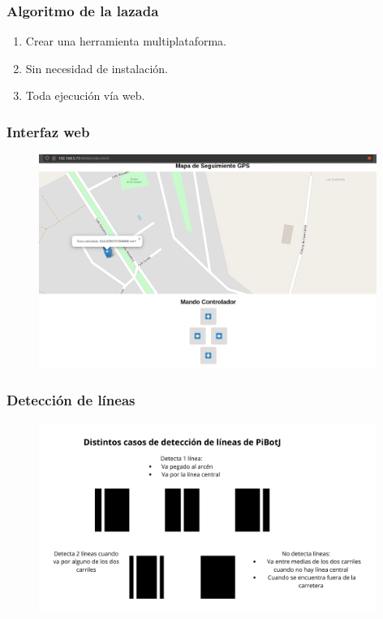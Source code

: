 \documentclass{beamer}
\begin{document}
\begin{frame}
	\frametitle{Algoritmo de la lazada}
	\begin{enumerate}
		\item Crear una herramienta multiplataforma.
		\item Sin necesidad de instalación.
		\item Toda ejecución vía web.
	\end{enumerate}
\end{frame}

\begin{frame}
	\frametitle{Interfaz web}
	\begin{figure}
		\centering
		\includegraphics[width=11cm]{figs/interfazweb.png}
	\end{figure}
\end{frame}

\begin{frame}
	\frametitle{Detección de líneas}
	\begin{figure}
		\centering
		\includegraphics[width=11cm]{figs/casosdlines.png}
	\end{figure}
\end{frame}
\end{document}
